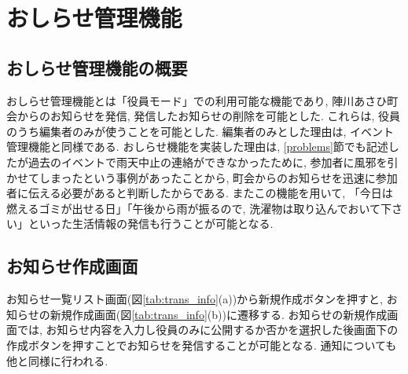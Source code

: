 \section{おしらせ管理機能}%
\subsection{おしらせ管理機能の概要}%
おしらせ管理機能とは「役員モード」での利用可能な機能であり, 陣川あさひ町会からのお知らせを発信, 発信したお知らせの削除を可能とした. これらは, 役員のうち編集者のみが使うことを可能とした. 編集者のみとした理由は, イベント管理機能と同様である. おしらせ機能を実装した理由は, \ref{problems}節でも記述したが過去のイベントで雨天中止の連絡ができなかったために, 参加者に風邪を引かせてしまったという事例があったことから, 町会からのお知らせを迅速に参加者に伝える必要があると判断したからである. またこの機能を用いて, 「今日は燃えるゴミが出せる日」「午後から雨が振るので, 洗濯物は取り込んでおいて下さい」といった生活情報の発信も行うことが可能となる.


\subsection{お知らせ作成画面}%
お知らせ一覧リスト画面(図\ref{tab:trans_info}(a))から新規作成ボタンを押すと, お知らせの新規作成画面(図\ref{tab:trans_info}(b))に遷移する. お知らせの新規作成画面では, お知らせ内容を入力し役員のみに公開するか否かを選択した後画面下の作成ボタンを押すことでお知らせを発信することが可能となる. 通知についても他と同様に行われる.

